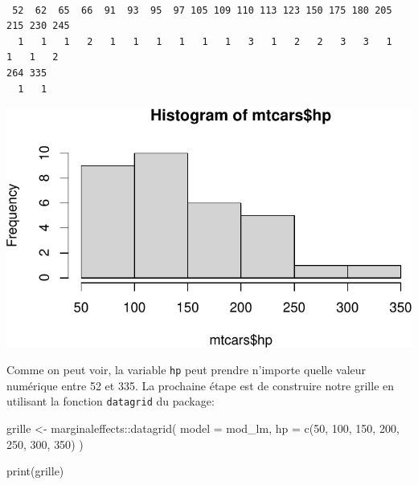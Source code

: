 \documentclass[
  letterpaper,
  DIV=11,
  numbers=noendperiod]{scrreprt}
\newenvironment{Shaded}{\begin{snugshade}}{\end{snugshade}}
\newcommand{\AttributeTok}[1]{\textcolor[rgb]{0.40,0.45,0.13}{#1}}
\newcommand{\DecValTok}[1]{\textcolor[rgb]{0.68,0.00,0.00}{#1}}
\newcommand{\FunctionTok}[1]{\textcolor[rgb]{0.28,0.35,0.67}{#1}}
\newcommand{\NormalTok}[1]{\textcolor[rgb]{0.00,0.23,0.31}{#1}}
\newcommand{\OtherTok}[1]{\textcolor[rgb]{0.00,0.23,0.31}{#1}}
\newcommand{\SpecialCharTok}[1]{\textcolor[rgb]{0.37,0.37,0.37}{#1}}
\begin{document}
\begin{verbatim}

 52  62  65  66  91  93  95  97 105 109 110 113 123 150 175 180 205 215 230 245 
  1   1   1   2   1   1   1   1   1   1   3   1   2   2   3   3   1   1   1   2 
264 335 
  1   1 
\end{verbatim}

\begin{Shaded}
\end{Shaded}

\includegraphics{chapitre_6_files/figure-pdf/unnamed-chunk-8-1.pdf}

Comme on peut voir, la variable \texttt{hp} peut prendre n'importe
quelle valeur numérique entre 52 et 335. La prochaine étape est de
construire notre grille en utilisant la fonction \texttt{datagrid} du
package:

\begin{Shaded}
\begin{Highlighting}[]
\NormalTok{grille }\OtherTok{\textless{}{-}}\NormalTok{ marginaleffects}\SpecialCharTok{::}\FunctionTok{datagrid}\NormalTok{(}
      \AttributeTok{model =}\NormalTok{ mod\_lm,}
      \AttributeTok{hp =} \FunctionTok{c}\NormalTok{(}\DecValTok{50}\NormalTok{, }\DecValTok{100}\NormalTok{, }\DecValTok{150}\NormalTok{, }\DecValTok{200}\NormalTok{, }\DecValTok{250}\NormalTok{, }\DecValTok{300}\NormalTok{, }\DecValTok{350}\NormalTok{)}
\NormalTok{)}

\FunctionTok{print}\NormalTok{(grille)}
\end{Highlighting}
\end{Shaded}
\end{document}
